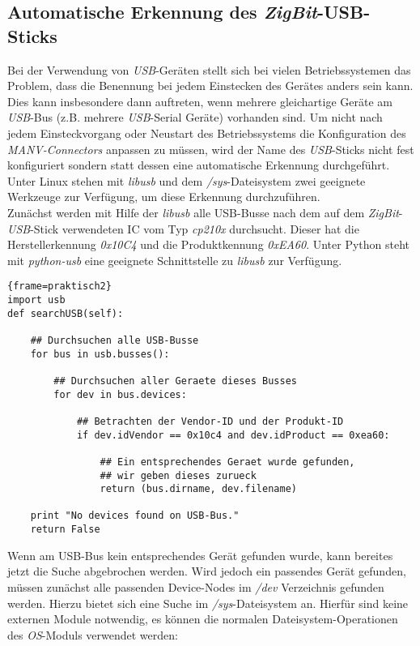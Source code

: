 \subsection{Automatische Erkennung des \emph{ZigBit}-USB-Sticks}

Bei der Verwendung von \emph{USB}-Geräten stellt sich bei vielen Betriebssystemen das Problem,
dass die Benennung bei jedem Einstecken des Gerätes anders sein kann. Dies kann insbesondere
dann auftreten, wenn mehrere gleichartige Geräte am \emph{USB}-Bus (z.B. mehrere \emph{USB}-Serial
Geräte) vorhanden sind. Um nicht nach jedem Einsteckvorgang oder Neustart des Betriebssystems die
Konfiguration des \emph{MANV-Connectors} anpassen zu müssen, wird der Name des \emph{USB}-Sticks
nicht fest konfiguriert sondern statt dessen eine automatische Erkennung durchgeführt.
Unter Linux stehen mit \emph{libusb} und dem \emph{/sys}-Dateisystem zwei geeignete Werkzeuge
zur Verfügung, um diese Erkennung durchzuführen.\\
Zunächst werden mit Hilfe der \emph{libusb} alle USB-Busse nach dem auf dem \emph{ZigBit}-\emph{USB}-Stick
verwendeten IC vom Typ \emph{cp210x} durchsucht. Dieser hat die Herstellerkennung \emph{0x10C4} und die
Produktkennung \emph{0xEA60}. Unter Python steht mit \emph{python-usb} eine geeignete Schnittstelle zu
\emph{libusb} zur Verfügung.

\begin{lstlisting}{frame=praktisch2}
import usb
def searchUSB(self):

    ## Durchsuchen alle USB-Busse 
    for bus in usb.busses():

        ## Durchsuchen aller Geraete dieses Busses
        for dev in bus.devices:

            ## Betrachten der Vendor-ID und der Produkt-ID
            if dev.idVendor == 0x10c4 and dev.idProduct == 0xea60:
               
                ## Ein entsprechendes Geraet wurde gefunden,
                ## wir geben dieses zurueck 
                return (bus.dirname, dev.filename)
   
    print "No devices found on USB-Bus."
    return False
\end{lstlisting}

Wenn am USB-Bus kein entsprechendes Gerät gefunden wurde, kann bereites jetzt die Suche abgebrochen werden.
Wird jedoch ein passendes Gerät gefunden, müssen zunächst alle passenden Device-Nodes im \emph{/dev} 
Verzeichnis gefunden werden. Hierzu bietet sich eine Suche im \emph{/sys}-Dateisystem an. Hierfür sind keine
externen Module notwendig, es können die normalen Dateisystem-Operationen des \emph{OS}-Moduls verwendet werden:

